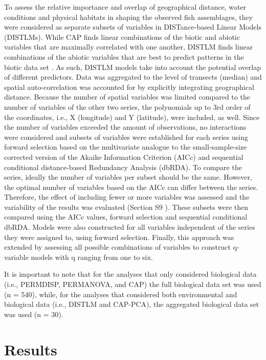 \documentclass[jmse,article,accept,moreauthors,pdftex]{Definitions/mdpi}
\begin{document}
To assess the relative importance and overlap of geographical distance, water conditions and physical habitats in shaping the observed fish assemblages, they were considered as separate subsets of variables in DISTance-based Linear Models (DISTLMs). While CAP finds linear combinations of the biotic and abiotic variables that are maximally correlated with one another, DISTLM finds linear combinations of the abiotic variables that are best to predict patterns in the biotic data set \citep{Anderson2008PERMANOVA+Methods}. As such, DISTLM models take into account the potential overlap of different predictors. Data was aggregated to the level of transects (median) and spatial auto-correlation was accounted for by explicitly integrating geographical distance. Because the number of spatial variables was limited compared to the number of variables of the other two series, the polynomials up to 3rd order of the coordinates, i.e., X (longitude) and Y (latitude), were included, as well. Since the number of variables exceeded the amount of observations, no interactions were considered and subsets of variables were established for each series using forward selection based on the multivariate analogue to the small-sample-size corrected version of the Akaike Information Criterion (AICc) and sequential conditional distance-based Redundancy Analysis (dbRDA). To compare the series, ideally the number of variables per subset should be the same. However, the optimal number of variables based on the AICc can differ between the series. Therefore, the effect of including fewer or more variables was assessed and the variability of the results was evaluated ({Section S9}%
). These subsets were then compared using the AICc values, forward selection and sequential conditional dbRDA. Models were also constructed for all variables independent of the series they were assigned to, using forward selection. Finally, this approach was extended by assessing all possible combinations of variables to construct q-variable models with q ranging from one to six. 

It is important to note that for the analyses that only considered biological data (i.e., PERMDISP, PERMANOVA, and CAP) the full biological data set was used (n = 540), while, for the analyses that considered both environmental and biological data (i.e., DISTLM and CAP-PCA), the aggregated biological data set was used (n = 30).

%
\section{Results}
\label{Results}
\end{document}
